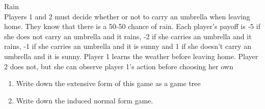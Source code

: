 \documentclass[../main.tex]{subfiles}
\begin{document}
\begin{question}
Rain\\
Players 1 and 2 must decide whether or not to carry an umbrella when leaving home. They know that there is a 50-50 chance of rain. Each player's payoff is -5 if she does not carry an umbrella and it rains, -2 if she carries an umbrella and it rains, -1 if she carries an umbrella and it is sunny and 1 if she doesn't carry an umbrella and it is sunny. Player 1 learns the weather before leaving home. Player 2 does not, but she can observe player 1's action before choosing her own
\begin{enumerate}
\item Write down the extensive form of this game as a game tree
\item Write down the induced normal form game.
\end{enumerate}
\end{question}
\end{document}
